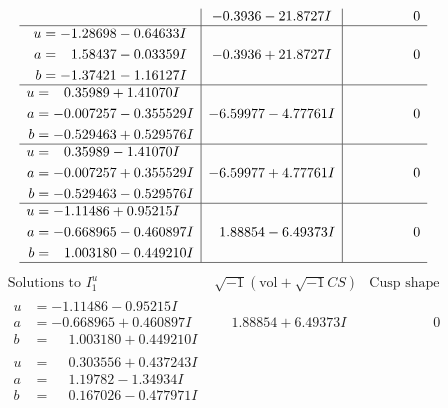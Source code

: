 \documentclass[1p]{elsarticle_modified}
\theoremstyle{definition}
\newcommand{\I}{\sqrt{-1}}
\begin{document}
$$\begin{array}{c|c|c}
 & -0.3936 - 21.8727 I & \phantom{-0.000000 } 0 \\ \hline\begin{aligned}
u &= -1.28698 - 0.64633 I \\
a &= \phantom{-}1.58437 - 0.03359 I \\
b &= -1.37421 - 1.16127 I\end{aligned}
 & -0.3936 + 21.8727 I & \phantom{-0.000000 } 0 \\ \hline\begin{aligned}
u &= \phantom{-}0.35989 + 1.41070 I \\
a &= -0.007257 - 0.355529 I \\
b &= -0.529463 + 0.529576 I\end{aligned}
 & -6.59977 - 4.77761 I & \phantom{-0.000000 } 0 \\ \hline\begin{aligned}
u &= \phantom{-}0.35989 - 1.41070 I \\
a &= -0.007257 + 0.355529 I \\
b &= -0.529463 - 0.529576 I\end{aligned}
 & -6.59977 + 4.77761 I & \phantom{-0.000000 } 0 \\ \hline\begin{aligned}
u &= -1.11486 + 0.95215 I \\
a &= -0.668965 - 0.460897 I \\
b &= \phantom{-}1.003180 - 0.449210 I\end{aligned}
 & \phantom{-}1.88854 - 6.49373 I & \phantom{-0.000000 } 0\\
 \hline 
 \end{array}$$\newpage$$\begin{array}{c|c|c}  
\text{Solutions to }I^u_{1}& \I (\text{vol} + \sqrt{-1}CS) & \text{Cusp shape}\\
 \hline 
\begin{aligned}
u &= -1.11486 - 0.95215 I \\
a &= -0.668965 + 0.460897 I \\
b &= \phantom{-}1.003180 + 0.449210 I\end{aligned}
 & \phantom{-}1.88854 + 6.49373 I & \phantom{-0.000000 } 0 \\ \hline\begin{aligned}
u &= \phantom{-}0.303556 + 0.437243 I \\
a &= \phantom{-}1.19782 - 1.34934 I \\
b &= \phantom{-}0.167026 - 0.477971 I\end{aligned}

\end{array}$$
\end{document}
